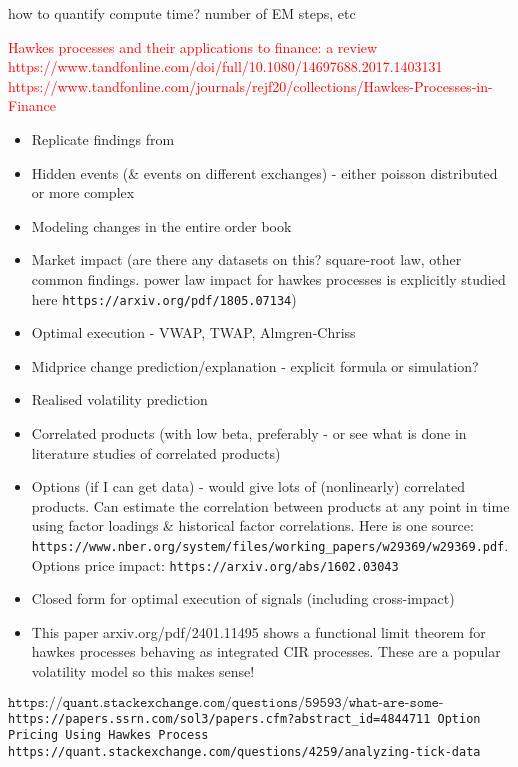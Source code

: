 \documentclass[honours,12pt]{unswthesis}
\numberwithin{equation}{section}
\begin{document}
how to quantify compute time? number of EM steps, etc

\textcolor{red}{Hawkes processes and their applications to finance: a review https://www.tandfonline.com/doi/full/10.1080/14697688.2017.1403131}
\textcolor{red}{https://www.tandfonline.com/journals/rejf20/collections/Hawkes-Processes-in-Finance}


\begin{itemize}
	\item Replicate findings from \cite{MorariuPatrichiPakkanen}
	\item Hidden events (\& events on different exchanges) - either poisson distributed or more complex
	\item Modeling changes in the entire order book
	\item Market impact (are there any datasets on this? square-root law, other common findings. power law impact for hawkes processes is explicitly studied here \texttt{https://arxiv.org/pdf/1805.07134})
	\item Optimal execution - VWAP, TWAP, Almgren-Chriss
	\item Midprice change prediction/explanation - explicit formula or simulation?
	\item Realised volatility prediction
	\item Correlated products (with low beta, preferably - or see what is done in literature studies of correlated products)
	\item Options (if I can get data) - would give lots of (nonlinearly) correlated products. Can estimate the correlation between products at any point in time using factor loadings \& historical factor correlations. Here is one source: \texttt{https://www.nber.org/system/files/working_papers/w29369/w29369.pdf}. Options price impact: \texttt{https://arxiv.org/abs/1602.03043}
	\item Closed form for optimal execution of signals (including cross-impact)
	\item This paper arxiv.org/pdf/2401.11495 shows a functional limit theorem for hawkes processes behaving as integrated CIR processes. These are a popular volatility model so this makes sense!
\end{itemize}

$\texttt{https://quant.stackexchange.com/questions/59593/what-are-some-currently-open-problems-in-market-microstructure}$
\texttt{https://papers.ssrn.com/sol3/papers.cfm?abstract_id=4844711 Option Pricing Using Hawkes Process}
\texttt{https://quant.stackexchange.com/questions/4259/analyzing-tick-data}
\end{document}
